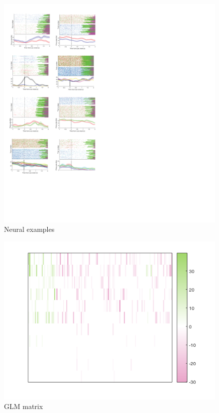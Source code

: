 \documentclass[11pt]{article}
\begin{document}
\begin{figure}[h]
\centering
\includegraphics[width=\textwidth]{Fig 5 - Neural examples.png}
\caption{Neural examples}
\label{fig:examples}
\end{figure}

\begin{figure}[h]
\centering
\includegraphics[width=\textwidth]{Fig 6 - GLM matrix.png}
\caption{GLM matrix}
\label{fig:GLM}
\end{figure}
\end{document}
